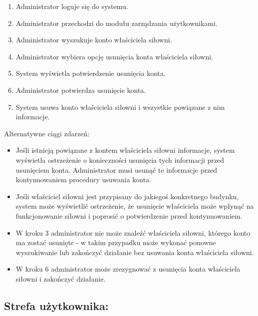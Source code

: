 \documentclass[
]{article}
\providecommand{\tightlist}{%
  \setlength{\itemsep}{0pt}\setlength{\parskip}{0pt}}
\begin{document}
\begin{enumerate}
\tightlist
\item
  {Administrator loguje się do systemu.}
\item
  {Administrator przechodzi do modułu zarządzania użytkownikami.}
\item
  {Administrator wyszukuje konto właściciela siłowni.}
\item
  {Administrator wybiera opcję usunięcia konta właściciela siłowni.}
\item
  {System wyświetla potwierdzenie usunięcia konta.}
\item
  {Administrator potwierdza usunięcie konta.}
\item
  {System usuwa konto właściciela siłowni i wszystkie powiązane z nim
  informacje.}
\end{enumerate}

{Alternatywne ciągi zdarzeń:}

\begin{itemize}
\tightlist
\item
  {Jeśli istnieją powiązane z kontem właściciela siłowni informacje,
  system wyświetla ostrzeżenie o konieczności usunięcia tych informacji
  przed usunięciem konta. Administrator musi usunąć te informacje przed
  kontynuowaniem procedury usuwania konta.}
\item
  {Jeśli właściciel siłowni jest przypisany do jakiegoś konkretnego
  budynku, system może wyświetlić ostrzeżenie, że usunięcie właściciela
  może wpłynąć na funkcjonowanie siłowni i poprosić o potwierdzenie
  przed kontynuowaniem.}
\item
  {W kroku 3 administrator nie może znaleźć właściciela siłowni, którego
  konto ma zostać usunięte - w takim przypadku może wykonać ponowne
  wyszukiwanie lub zakończyć działanie bez usuwania konta właściciela
  siłowni.}
\item
  {W kroku 6 administrator może zrezygnować z usunięcia konta
  właściciela siłowni i zakończyć działanie.}
\end{itemize}

{}

{}

{}

\hypertarget{h.53mnna977pi7}{%
\subsection{\texorpdfstring{{Strefa
użytkownika:}}{Strefa użytkownika:}}\label{h.53mnna977pi7}}
\end{document}

